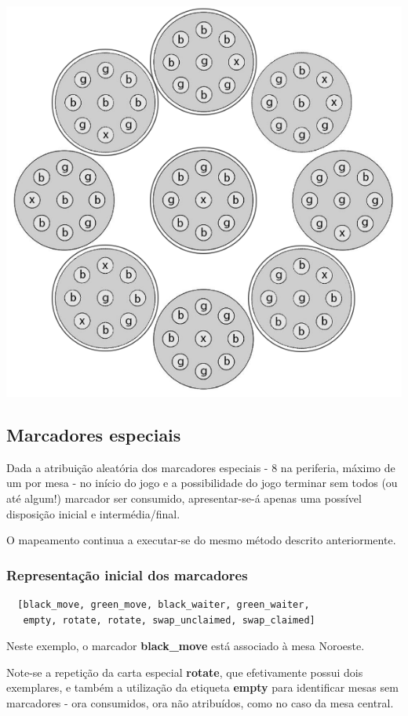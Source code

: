 \documentclass[a4paper]{article}
\begin{document}
\includegraphics[scale=0.5]{board-setup-3.png}

\subsection{Marcadores especiais}
Dada a atribuição aleatória dos marcadores especiais - 8 na periferia, máximo de um por mesa - no início do jogo e a possibilidade do jogo terminar sem todos (ou até algum!) marcador ser consumido, apresentar-se-á apenas uma possível disposição inicial e intermédia/final.

O mapeamento continua a executar-se do mesmo método descrito anteriormente.

\subsubsection{Representação inicial dos marcadores}
\begin{lstlisting}
  [black_move, green_move, black_waiter, green_waiter, 
   empty, rotate, rotate, swap_unclaimed, swap_claimed]
\end{lstlisting}

Neste exemplo, o marcador \textbf{black\_move} está associado à mesa Noroeste.

Note-se a repetição da carta especial \textbf{rotate}, que efetivamente possui dois exemplares, e também a utilização da etiqueta \textbf{empty} para identificar mesas sem marcadores - ora consumidos, ora não atribuídos, como no caso da mesa central. \newline
\end{document}
